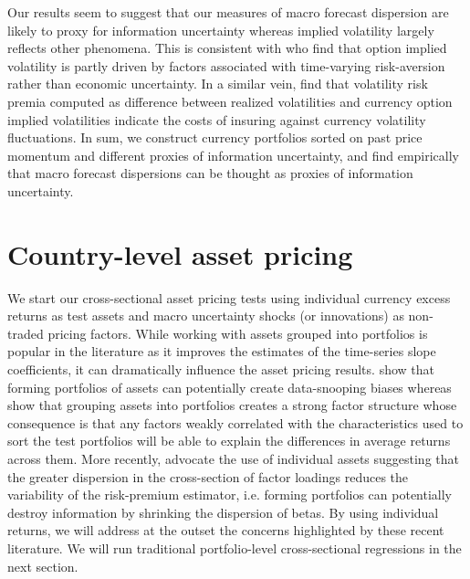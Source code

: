 Our results seem to suggest that our measures of macro forecast dispersion are likely to proxy for information uncertainty whereas implied volatility largely reflects other phenomena. This is consistent with \citet{Bekaert/Hoerova/LoDuca:2013} who find that option implied volatility is partly driven by factors associated with time-varying risk-aversion rather than economic uncertainty. In a similar vein, \citet{dellacorte_etal2014} find that volatility risk premia computed as difference between realized volatilities and currency option implied volatilities indicate the costs of insuring against currency volatility fluctuations. In sum, we construct currency portfolios sorted on past price momentum and different proxies of information uncertainty, and find empirically that macro forecast dispersions can be thought as proxies of information uncertainty. %

\section{Country-level asset pricing}\label{sec:ap_individual_UNC_CAR}
We start our cross-sectional asset pricing tests using individual currency excess returns as test assets and macro uncertainty shocks (or innovations) as non-traded pricing factors. While working with assets grouped into portfolios is popular in the literature as it improves the estimates of the time-series slope coefficients, it can dramatically influence the asset pricing results. \citet{LM/1990} show that forming portfolios of assets can potentially create data-snooping biases whereas \citet{lewellenetal:10-jfe} show that grouping assets into portfolios creates a strong factor structure whose consequence is that any factors weakly correlated with the characteristics used to sort the test portfolios will be able to explain the differences in average returns across them. More recently, \citet{ALS/2010} advocate the use of individual assets suggesting that the greater dispersion in the cross-section of factor loadings reduces the variability of the risk-premium estimator, i.e. forming portfolios can potentially destroy information by shrinking the dispersion of betas. By using individual returns, we will address at the outset the concerns highlighted by these recent literature. We will run traditional portfolio-level cross-sectional regressions in the next section.

